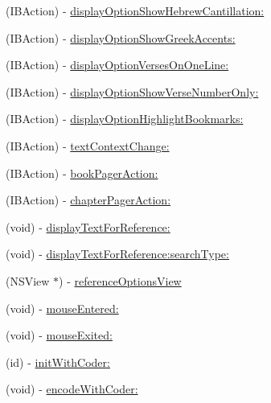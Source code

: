 \begin{DoxyCompactItemize}
\item 
(I\-B\-Action) -\/ \hyperlink{interface_module_commons_view_controller_a37796929aa7e5310ba19ed08aab07683}{display\-Option\-Show\-Hebrew\-Cantillation\-:}
\item 
(I\-B\-Action) -\/ \hyperlink{interface_module_commons_view_controller_a5a6a0ef3d699f83d9b0338cc7d47f7fe}{display\-Option\-Show\-Greek\-Accents\-:}
\item 
(I\-B\-Action) -\/ \hyperlink{interface_module_commons_view_controller_a3a6f42512fab87e0d620f40e42bfaf11}{display\-Option\-Verses\-On\-One\-Line\-:}
\item 
(I\-B\-Action) -\/ \hyperlink{interface_module_commons_view_controller_a11569c74540756bb9eb752992582ba5c}{display\-Option\-Show\-Verse\-Number\-Only\-:}
\item 
(I\-B\-Action) -\/ \hyperlink{interface_module_commons_view_controller_a12ebf6f614086d51357ddb86b6bc2b1f}{display\-Option\-Highlight\-Bookmarks\-:}
\item 
(I\-B\-Action) -\/ \hyperlink{interface_module_commons_view_controller_a729ac648e31e214e647a11fdfcfd3ba5}{text\-Context\-Change\-:}
\item 
(I\-B\-Action) -\/ \hyperlink{interface_module_commons_view_controller_a96892b268465f73d92bc2c0bd201df76}{book\-Pager\-Action\-:}
\item 
(I\-B\-Action) -\/ \hyperlink{interface_module_commons_view_controller_aeef73698cbb37e7822a233bc39ab9e1d}{chapter\-Pager\-Action\-:}
\item 
(void) -\/ \hyperlink{interface_module_commons_view_controller_aee0469066a38e5b41b9de3e4e87fe05b}{display\-Text\-For\-Reference\-:}
\item 
(void) -\/ \hyperlink{interface_module_commons_view_controller_aee0f4fccfed1c999da9746c4a8ed6fc0}{display\-Text\-For\-Reference\-:search\-Type\-:}
\item 
(N\-S\-View $\ast$) -\/ \hyperlink{interface_module_commons_view_controller_a20e0066c6ffdb151067053c9e5b00129}{reference\-Options\-View}
\item 
(void) -\/ \hyperlink{interface_module_commons_view_controller_a13a1d8a374c5a945bfa34dd3058ef6ab}{mouse\-Entered\-:}
\item 
(void) -\/ \hyperlink{interface_module_commons_view_controller_ac229af7b37d54405d9564790876bb02d}{mouse\-Exited\-:}
\item 
(id) -\/ \hyperlink{interface_module_commons_view_controller_a6cf57c30ef62d8a0b74eafd74d0f8b39}{init\-With\-Coder\-:}
\item 
(void) -\/ \hyperlink{interface_module_commons_view_controller_a958c5e82e2f22a1a132161999b5d1704}{encode\-With\-Coder\-:}
\end{DoxyCompactItemize}
